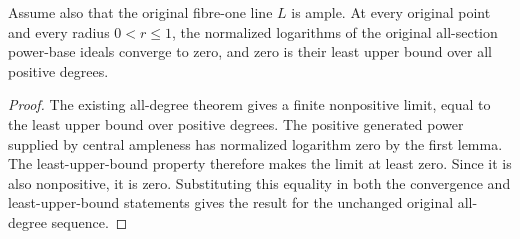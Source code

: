 \begin{theorem}
\label{thm:central-ample-original-all-degree-zero-correction}
\leanok
Assume also that the original fibre-one line $L$ is ample. At every
original point and every radius $0<r\leq1$, the normalized logarithms
of the original all-section power-base ideals converge to zero, and
zero is their least upper bound over all positive degrees.
\end{theorem}
\begin{proof}
\leanok
The existing all-degree theorem gives a finite nonpositive limit, equal
to the least upper bound over positive degrees. The positive generated
power supplied by central ampleness has normalized logarithm zero by
the first lemma. The least-upper-bound property therefore makes the
limit at least zero. Since it is also nonpositive, it is zero. Substituting
this equality in both the convergence and least-upper-bound statements
gives the result for the unchanged original all-degree sequence.
\end{proof}
